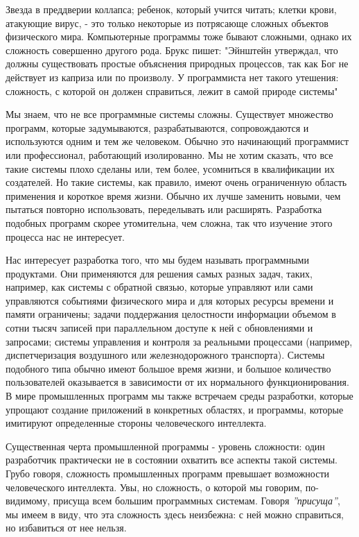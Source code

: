\documentclass[11pt]{article}
\begin{document}
Звезда в преддверии коллапса; ребенок, который учится читать; клетки крови,  атакующие вирус, - это только некоторые из потрясающе сложных объектов физического мира. Компьютерные программы тоже бывают сложными, однако их сложность совершенно другого рода. Брукс пишет: "Эйнштейн утверждал, что должны существовать простые объяснения природных процессов, так как Бог не действует из каприза или по произволу. У программиста нет такого утешения: сложность, с которой он должен справиться, лежит в самой природе системы" 
\par
\parskip=2mm
Мы знаем, что не все программные системы сложны. Существует множество программ, которые задумываются, разрабатываются, сопровождаются и используются одним и тем же человеком. Обычно это начинающий программист или профессионал, работающий изолированно. Мы не хотим сказать, что все такие системы плохо сделаны или, тем более, усомниться в квалификации их создателей. Но такие системы, как правило, имеют очень ограниченную область применения и короткое время жизни. Обычно их лучше заменить новыми, чем пытаться повторно использовать, переделывать или расширять. Разработка подобных программ скорее утомительна, чем сложна, так что изучение этого процесса нас не интересует.
\par
Нас интересует разработка того, что мы будем называть { программными продуктами.} Они применяются для решения самых разных задач, таких, например, как системы с обратной связью, которые управляют или сами управляются событиями физического мира и для которых ресурсы времени и памяти ограничены; задачи поддержания целостности информации объемом в сотни тысяч записей при параллельном доступе к ней с обновлениями и запросами; системы управления и контроля за реальными процессами (например, диспетчеризация воздушного или железнодорожного транспорта). Системы подобного типа обычно имеют большое время жизни, и большое количество пользователей оказывается в зависимости от их нормального функционирования. В мире промышленных программ мы также встречаем среды разработки, которые упрощают создание приложений в конкретных областях, и программы, которые имитируют определенные стороны человеческого интеллекта.
\par
Существенная черта промышленной программы - уровень сложности: один разработчик практически не в состоянии охватить все аспекты такой системы. Грубо говоря, сложность промышленных программ превышает возможности человеческого интеллекта. Увы, но сложность, о которой мы говорим, по-видимому, присуща всем большим программных системам. Говоря {\it''присуща''}, мы имеем в виду, что эта сложность здесь неизбежна: с ней можно справиться, но избавиться от нее нельзя. 
\end{document}

